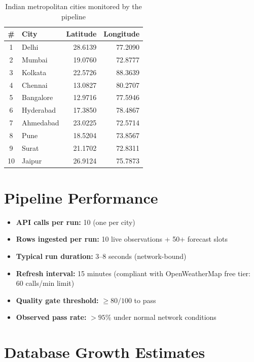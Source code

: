 \documentclass[12pt,a4paper]{report}
\begin{document}
\begin{table}[H]
  \centering
  \caption{Indian metropolitan cities monitored by the pipeline}
  \label{tab:cities}
  \begin{tabular}{c l r r}
    \toprule
    \textbf{\#} & \textbf{City} & \textbf{Latitude} & \textbf{Longitude} \\
    \midrule
    1  & Delhi      & 28.6139 & 77.2090 \\
    2  & Mumbai     & 19.0760 & 72.8777 \\
    3  & Kolkata    & 22.5726 & 88.3639 \\
    4  & Chennai    & 13.0827 & 80.2707 \\
    5  & Bangalore  & 12.9716 & 77.5946 \\
    6  & Hyderabad  & 17.3850 & 78.4867 \\
    7  & Ahmedabad  & 23.0225 & 72.5714 \\
    8  & Pune       & 18.5204 & 73.8567 \\
    9  & Surat      & 21.1702 & 72.8311 \\
    10 & Jaipur     & 26.9124 & 75.7873 \\
    \bottomrule
  \end{tabular}
\end{table}

\section{Pipeline Performance}

\begin{itemize}
  \item \textbf{API calls per run:} 10 (one per city)
  \item \textbf{Rows ingested per run:} 10 live observations + 50+ forecast slots
  \item \textbf{Typical run duration:} 3--8 seconds (network-bound)
  \item \textbf{Refresh interval:} 15 minutes (compliant with OpenWeatherMap free tier: 60 calls/min limit)
  \item \textbf{Quality gate threshold:} $\geq 80 / 100$ to pass
  \item \textbf{Observed pass rate:} $>95\%$ under normal network conditions
\end{itemize}

\section{Database Growth Estimates}
\end{document}
